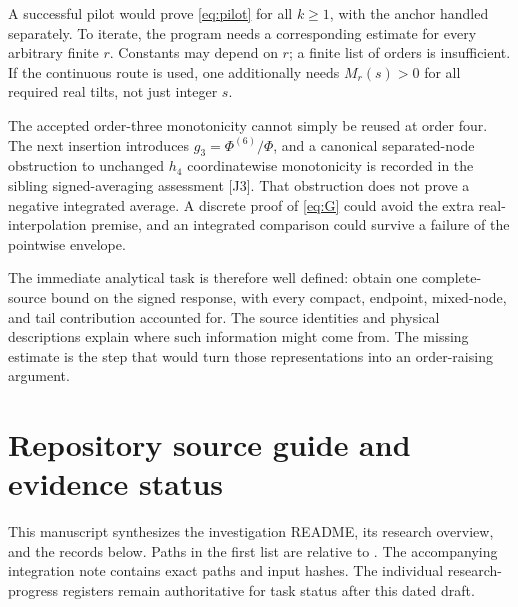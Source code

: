 \documentclass[11pt,letterpaper]{article}
\numberwithin{equation}{section}
\theoremstyle{remark}
\newcommand{\evid}[1]{\textsf{[#1]}}
\begin{document}
A successful pilot would prove \eqref{eq:pilot} for all $k\ge1$,
with the anchor handled separately. To iterate, the program needs a
corresponding estimate for every arbitrary finite $r$. Constants may
depend on $r$; a finite list of orders is insufficient. If the continuous
route is used, one additionally needs $M_r(s)>0$ for all required real
tilts, not just integer $s$.

The accepted order-three monotonicity cannot simply be reused at order
four. The next insertion introduces $g_3=\Phi^{(6)}/\Phi$, and a
canonical separated-node obstruction to unchanged $h_4$ coordinatewise
monotonicity is recorded in the sibling signed-averaging assessment
\evid{J3}. That obstruction does not prove a negative integrated
average. A discrete proof of \eqref{eq:G} could avoid the extra
real-interpolation premise, and an integrated comparison could survive
a failure of the pointwise envelope.

The immediate analytical task is therefore well defined: obtain one
complete-source bound on the signed response, with every compact,
endpoint, mixed-node, and tail contribution accounted for. The source
identities and physical descriptions explain where such information
might come from. The missing estimate is the step that would turn those
representations into an order-raising argument.

\appendix
\section{Repository source guide and evidence status}
\label{sec:sources}

This manuscript synthesizes the investigation README, its research
overview, and the records below. Paths in the first list are relative to
.
The accompanying integration note contains exact paths and input hashes.
The individual research-progress registers remain authoritative for task
status after this dated draft.
\end{document}
